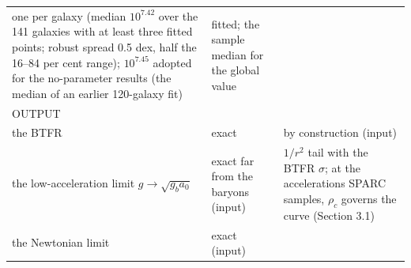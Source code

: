 \documentclass[
  10pt,
]{article}
\begin{document}
\begin{longtable}[]{@{}lll@{}}
\begin{minipage}[t]{0.20\columnwidth}
one per galaxy (median $10^{7.42}$ over the 141 galaxies with at least three fitted points; robust spread 0.5 dex, half the 16--84 per cent range); $10^{7.45}$ adopted for the no-parameter
results (the median of an earlier 120-galaxy fit)\strut
\end{minipage} & \begin{minipage}[t]{0.50\columnwidth}\raggedright
fitted; the sample median for the global value\strut
\end{minipage}\tabularnewline
\begin{minipage}[t]{0.24\columnwidth}\raggedright
OUTPUT\strut
\end{minipage} & \begin{minipage}[t]{0.20\columnwidth}\raggedright
\strut
\end{minipage} & \begin{minipage}[t]{0.50\columnwidth}\raggedright
\strut
\end{minipage}\tabularnewline
\begin{minipage}[t]{0.24\columnwidth}\raggedright
the BTFR\strut
\end{minipage} & \begin{minipage}[t]{0.20\columnwidth}\raggedright
exact\strut
\end{minipage} & \begin{minipage}[t]{0.50\columnwidth}\raggedright
by construction (input)\strut
\end{minipage}\tabularnewline
\begin{minipage}[t]{0.24\columnwidth}\raggedright
the low-acceleration limit $g\to\sqrt{g_b a_0}$\strut
\end{minipage} & \begin{minipage}[t]{0.20\columnwidth}\raggedright
exact far from the baryons (input)\strut
\end{minipage} & \begin{minipage}[t]{0.50\columnwidth}\raggedright
$1/r^2$ tail with the BTFR $\sigma$; at the accelerations SPARC samples, $\rho_c$ governs the curve (Section 3.1)\strut
\end{minipage}\tabularnewline
\begin{minipage}[t]{0.24\columnwidth}\raggedright
the Newtonian limit\strut
\end{minipage} & \begin{minipage}[t]{0.20\columnwidth}\raggedright
exact (input)\strut
\end{minipage} & \begin{minipage}[t]{0.50\columnwidth}\raggedright

\end{minipage}
\end{longtable}
\end{document}
